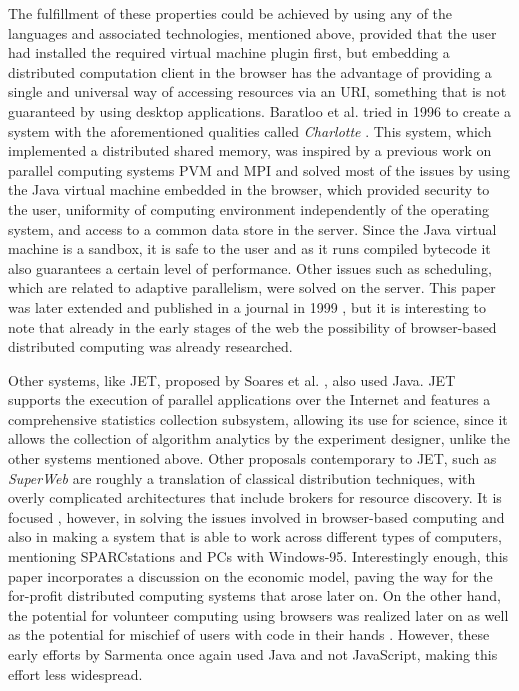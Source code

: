 \documentclass[journal,onecolumn]{IEEEtran}
\begin{document}
The fulfillment of these properties could be achieved by using any of the
languages and associated technologies, mentioned above, provided that the user had
installed the required virtual machine plugin first, 
but embedding a
distributed computation client in the browser has the advantage of
providing a single and universal way of accessing resources via an
URI, something that is not guaranteed by using desktop
applications. Baratloo et al. tried in 1996 to create a system with
the aforementioned qualities called {\em Charlotte}
\cite{baratloo1996charlotte}. This system, which implemented a
distributed shared memory, was inspired by a previous work
on parallel computing systems PVM and MPI and solved most of the issues by
using the Java virtual machine embedded in the browser,
which provided
security to the user, uniformity of computing environment
independently of the operating system, and access to a common data store in the
server. Since the Java virtual machine is a sandbox, it is safe to the user
and as it runs compiled bytecode it also guarantees a certain level of
performance.
Other issues such as scheduling, which are related to adaptive 
parallelism, were solved on the server. This
paper was later extended and published in a journal in 1999
\cite{baratloo1999charlotte}, but it is interesting to note that
already in the early stages of the web the possibility of
browser-based distributed computing was already researched.

Other systems, like JET, proposed by Soares et
al. \cite{soares1998get}, also used Java. JET supports
the execution of parallel applications over the Internet and features
a comprehensive statistics collection subsystem, allowing its use for science,
since it allows %
 the collection of algorithm analytics by the
experiment designer, unlike the other systems mentioned
above. Other proposals contemporary to JET, such as {\em SuperWeb}
\cite{alexandrov1997superweb} are roughly a translation of classical
distribution techniques, with overly complicated architectures that include
brokers for resource discovery. It is focused
, however, in solving the
issues involved in browser-based computing and also in making a system
that is able to work across different types of computers, mentioning
SPARCstations and PCs with Windows-95. Interestingly enough, this
paper incorporates a discussion on the economic model, paving the way
for the for-profit distributed computing systems that arose later on. 
On the other hand, the potential for volunteer computing using
browsers was realized
later on \cite{sarmenta-bayanihan} as well as the potential for
mischief of users with code in their hands
\cite{sarmenta-sabotagetolerance}. However, these early efforts by
Sarmenta once again used Java and not JavaScript, making this effort %
less widespread.
\end{document}
